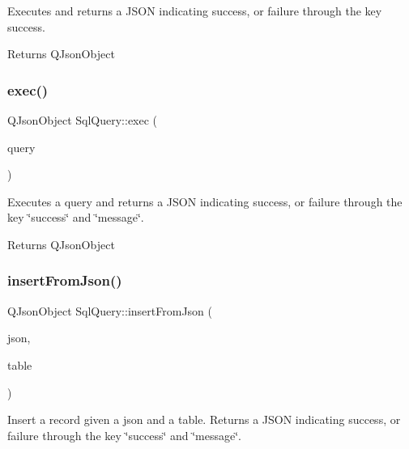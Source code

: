 Executes and returns a J\+S\+ON indicating success, or failure through the key success. 

\begin{DoxyReturn}{Returns}
Q\+Json\+Object 
\end{DoxyReturn}
\mbox{\label{class_sql_query_a5fa16018f76ee798660343bc5fabe8a0}} 
\subsubsection{\texorpdfstring{exec()}{exec()}\hspace{0.1cm}{\footnotesize\ttfamily [2/2]}}
{\footnotesize\ttfamily Q\+Json\+Object Sql\+Query\+::exec (\begin{DoxyParamCaption}\item[{const Q\+String \&}]{query }\end{DoxyParamCaption})}



Executes a query and returns a J\+S\+ON indicating success, or failure through the key \char`\"{}success\char`\"{} and \char`\"{}message\char`\"{}. 

\begin{DoxyReturn}{Returns}
Q\+Json\+Object 
\end{DoxyReturn}
\mbox{\label{class_sql_query_ad831477c3ce9914f7dcd8136e72af387}} 
\subsubsection{\texorpdfstring{insert\+From\+Json()}{insertFromJson()}}
{\footnotesize\ttfamily Q\+Json\+Object Sql\+Query\+::insert\+From\+Json (\begin{DoxyParamCaption}\item[{const Q\+Json\+Object \&}]{json,  }\item[{const Q\+String \&}]{table }\end{DoxyParamCaption})}



Insert a record given a json and a table. Returns a J\+S\+ON indicating success, or failure through the key \char`\"{}success\char`\"{} and \char`\"{}message\char`\"{}. 


